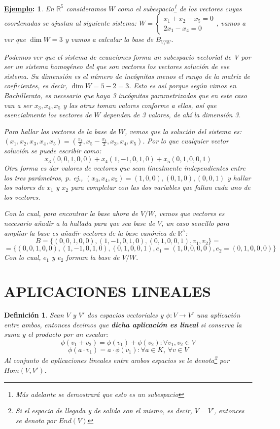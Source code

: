 \documentclass[10pt,a4paper,openright]{book}
\theoremstyle{break}
\newtheorem*{defi}{Definición}
\newtheorem*{ej}{\underline{Ejemplo}:}
\begin{document}
\begin{ej}
En $\mathbb R^5$ consideramos $W$ como el subespacio\footnote{Más adelante se demostrará que esto es un subespacio} de los vectores cuyas coordenadas se ajustan al siguiente sistema: $W=\begin{cases}
x_1+x_2-x_5=0 \\
2x_1-x_4=0
\end{cases}$, vamos a ver que $\dim W=3$ y vamos a calcular la base de $B_{V/W}$.

Podemos ver que el sistema de ecuaciones forma un subespacio vectorial de V por ser un sistema homogéneo del que son vectores los vectores solución de ese sistema. Su dimensión es el número de incógnitas menos el rango de la matriz de coeficientes, es decir, $\dim W=5-2=3$. Esto es así porque según vimos en Bachillerato, es necesario que haya 3 incógnitas parametrizadas que en este caso van a ser $x_3, x_4, x_5$ y las otras toman valores conforme a ellas, así que esencialmente los vectores de $W$ dependen de 3 valores, de ahí la dimensión 3.

Para hallar los vectores de la base de $W$, vemos que la solución del sistema es: $(x_1,x_2,x_3,x_4,x_5)=(\frac{x_4}{2}, x_5-\frac{x_4}{2},x_3,x_4,x_5)$. Por lo que cualquier vector solución se puede escribir como:
$$x_3(0,0,1,0,0)+x_4(1,-1,0,1,0)+x_5(0,1,0,0,1)$$
Otra forma es dar valores de vectores que sean linealmente independientes entre los tres parámetros, p. ej., $(x_3,x_4,x_5)=(1,0,0),(0,1,0), (0,0,1)$ y hallar los valores de $x_1$ y $x_2$ para completar con las dos variables que faltan cada uno de los vectores.\par
Con lo cual, para encontrar la base ahora de $V/W$, vemos que  vectores es necesario añadir a la hallada para que sea base de $V$, un caso sencillo para ampliar la base es añadir vectores de la base canónica de $\mathbb R^5$:
$$B=\{(0,0,1,0,0),(1,-1,0,1,0),(0,1,0,0,1), v_1, v_2\}=$$
$$=\{(0,0,1,0,0),(1,-1,0,1,0),(0,1,0,0,1), e_1=(1,0,0,0,0), e_2=(0,1,0,0,0)\}$$
Con lo cual, $e_1$ y $e_2$ forman la base de $V/W$.
\end{ej}

\section{APLICACIONES LINEALES}
\begin{defi}
Sean $V$ y $V'$ dos espacios vectoriales y $\phi:V\longrightarrow V'$ una aplicación entre ambos, entonces decimos que \textbf{dicha aplicación es lineal} si conserva la suma y el producto por un escalar:
$$\phi(v_1+v_2)=\phi(v_1)+\phi(v_2): \forall v_1,v_2\in V$$
$$\phi(a\cdot v_1)=a\cdot \phi(v_1): \forall a\in K,\ \forall v\in V$$
Al conjunto de aplicaciones lineales entre ambos espacios se le denota\footnote{Si el espacio de llegada y de salida son el mismo, es decir, $V=V'$, entonces se denota por $End(V)$} por $Hom(V,V')$.
\end{defi}
\end{document}
